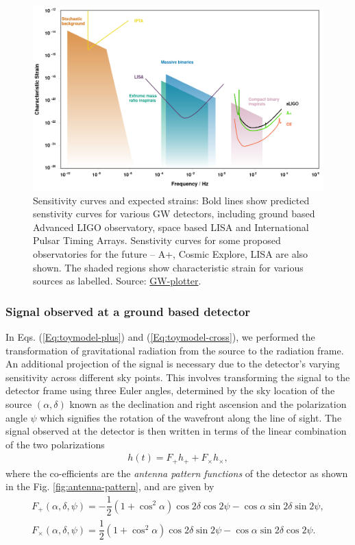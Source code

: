 \begin{figure}
    \centering
    \includegraphics[width=\textwidth]{figures/basic_data_analysis/Gw-plotter.png}
    \caption{Sensitivity curves and expected strains: Bold lines show predicted senstivity curves for various GW detectors, including ground based Advanced LIGO observatory, space based LISA and International Pulsar Timing Arrays. Senstivity curves for some proposed observatories for the future -- A+, Cosmic Explore, LISA are also shown. The shaded regions show characteristic strain for various sources as labelled. Source: \href{http://gwplotter.com/}{GW-plotter}.}
    \label{fig:Gw-plotter}
\end{figure}

\subsubsection{Signal observed at a ground based detector}
In Eqs. (\ref{Eq:toymodel-plus}) and (\ref{Eq:toymodel-cross}), we performed the transformation of gravitational radiation from the source to the radiation frame. An additional projection of the signal is necessary due to the detector's varying sensitivity across different sky points. This involves transforming the signal to the detector frame using three Euler angles, determined by the sky location of the source $(\alpha,\delta)$ known as the declination and right ascension and the polarization angle $\psi$ which signifies the rotation of the wavefront along the line of sight. The signal observed at the detector is then written in terms of the linear combination of the two polarizations
\begin{align}
    h(t) = F_+h_+ + F_{\times}h_{\times},
    \label{Eq:}
\end{align}
where the co-efficients are the \textit{antenna pattern functions} of the detector as shown in the Fig. \ref{fig:antenna-pattern}, and are given by \cite{Schutz:2011tw}
\begin{align}
    F_{+}(\alpha,\delta,\psi) = -\dfrac{1}{2}(1+\cos^2\alpha)\cos 2\delta\cos 2\psi -\cos\alpha\sin 2\delta\sin 2\psi, \\
    F_{\times}(\alpha,\delta,\psi) = \dfrac{1}{2}(1+\cos^2\alpha)\cos 2\delta\sin 2\psi -\cos\alpha\sin 2\delta\cos 2\psi.
    \label{Eq:det-frame-signal}
\end{align}


